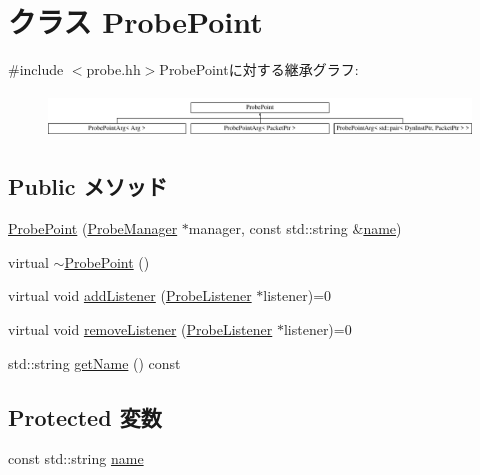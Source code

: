 \hypertarget{classProbePoint}{
\section{クラス ProbePoint}
\label{classProbePoint}
}


{\ttfamily \#include $<$probe.hh$>$}ProbePointに対する継承グラフ:\begin{figure}[H]
\begin{center}
\leavevmode
\includegraphics[height=1.18143cm]{classProbePoint}
\end{center}
\end{figure}
\subsection*{Public メソッド}
\begin{DoxyCompactItemize}
\item 
\hyperlink{classProbePoint_ac8c9fdc08f4c2b6c361b6abab2d56895}{ProbePoint} (\hyperlink{classProbeManager}{ProbeManager} $\ast$manager, const std::string \&\hyperlink{classProbePoint_ac673bc430bdc3fdaa09f7becf98ef267}{name})
\item 
virtual \hyperlink{classProbePoint_a26266ccd26aa2058bf2bdf7ba13e00f2}{$\sim$ProbePoint} ()
\item 
virtual void \hyperlink{classProbePoint_a6faaaab14f1e331042dbc6a84d74854b}{addListener} (\hyperlink{classProbeListener}{ProbeListener} $\ast$listener)=0
\item 
virtual void \hyperlink{classProbePoint_a6a2be0b9d814476147edeeb5afac43a0}{removeListener} (\hyperlink{classProbeListener}{ProbeListener} $\ast$listener)=0
\item 
std::string \hyperlink{classProbePoint_a33957ff81d96d5eb86be59fea5034afd}{getName} () const 
\end{DoxyCompactItemize}
\subsection*{Protected 変数}
\begin{DoxyCompactItemize}
\item 
const std::string \hyperlink{classProbePoint_ac673bc430bdc3fdaa09f7becf98ef267}{name}
\end{DoxyCompactItemize}


